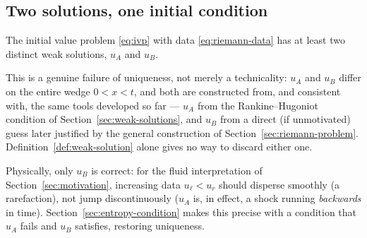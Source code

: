 \subsection{Two solutions, one initial condition}
\label{subsec:nonuniq-conclusion}

\begin{corollary}
\label{cor:nonuniqueness}
The initial value problem \eqref{eq:ivp} with data \eqref{eq:riemann-data}
has at least two distinct weak solutions, $u_A$ and $u_B$.
\end{corollary}

This is a genuine failure of uniqueness, not merely a technicality: $u_A$
and $u_B$ differ on the entire wedge $0<x<t$, and both are constructed
from, and consistent with, the same tools developed so far ---
$u_A$ from the Rankine--Hugoniot condition of
Section~\ref{sec:weak-solutions}, and $u_B$ from a direct (if unmotivated)
guess later justified by the general construction of
Section~\ref{sec:riemann-problem}. Definition~\ref{def:weak-solution}
alone gives no way to discard either one.

\begin{remark}
Physically, only $u_B$ is correct: for the fluid interpretation of
Section~\ref{sec:motivation}, increasing data $u_\ell<u_r$ should
disperse smoothly (a rarefaction), not jump discontinuously ($u_A$ is,
in effect, a shock running \emph{backwards} in time).
Section~\ref{sec:entropy-condition} makes this precise with a condition
that $u_A$ fails and $u_B$ satisfies, restoring uniqueness.
\end{remark}